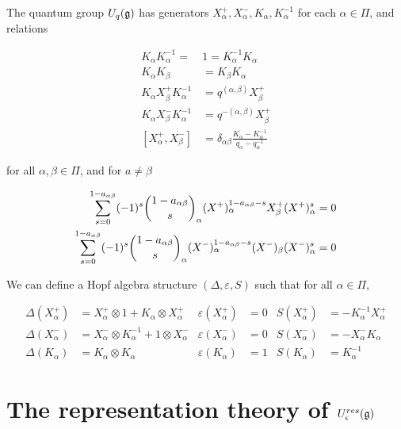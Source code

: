     \begin{defn}
    \label{UqgDef}
        The quantum group $U_q(\mathfrak{g})$ has generators
        $ X^+ _\alpha, X^-_\alpha, K_\alpha, K_\alpha^{-1}$ for each $\alpha \in
        \Pi$, and relations

        \begin{align}
            K_\alpha K_\alpha^{-1} =\ &1  = K_\alpha^{-1}K_\alpha \\
            K_\alpha K_\beta &= K_\beta K_\alpha \\
            K_\alpha  X^+ _\beta K_\alpha^{-1} &= q^{(\alpha, \beta)}  X^+ _\beta \\
            K_\alpha X^-_\beta K_\alpha^{-1} &= q^{-(\alpha, \beta)}  X^+ _\beta \\
            [ X^+ _\alpha, X^-_\beta] &= \delta_{\alpha\beta} \frac{K_\alpha - K_\alpha^{-1}}{ q_\alpha - q_\alpha^{-1}} 
        \end{align}

        for all $\alpha, \beta \in \Pi$, and for $a \neq \beta$

        \begin{align}
            \sum_{s=0}^{1-a_{\alpha\beta}} (-1)^s \dbinom{1-a_{\alpha\beta}}{s}_\alpha  (X^+)_\alpha^{1-a_{\alpha\beta} - s}  X^+_\beta  (X^+)_\alpha^s  &= 0 \\
            \sum_{s=0}^{1-a_{\alpha\beta}} (-1)^s \dbinom{1-a_{\alpha\beta}}{s}_\alpha (X^-)_\alpha^{1-a_{\alpha\beta} - s} (X^-)_\beta (X^-)_\alpha^s  &= 0 
        \end{align}
    \end{defn}

We can define a Hopf algebra structure $(\Delta, \varepsilon, S)$ such
that for all $\alpha \in \Pi$,

    \begin{align}
        \Delta( X^+ _\alpha) &=  X^+ _\alpha \otimes 1 + K_\alpha \otimes  X^+ _\alpha      & \varepsilon( X^+ _\alpha) &= 0  & S( X^+ _\alpha) &= -K_\alpha^{-1}  X^+ _\alpha \\
        \Delta(X^-_\alpha) &= X^-_\alpha \otimes K_\alpha^{-1} + 1 \otimes X^-_\alpha & \varepsilon(X^-_\alpha) &= 0  & S(X^-_\alpha) &= -X^-_\alpha K_\alpha \\
        \Delta(K_\alpha) &= K_\alpha \otimes K_\alpha                           & \varepsilon(K_\alpha) &= 1  & S(K_\alpha) &= K_\alpha^{-1}
    \end{align}

\section{The representation theory of $U_\epsilon^{res}(\mathfrak{g})$}

